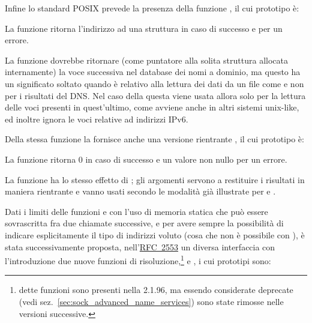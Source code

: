 Infine lo standard POSIX prevede la presenza della funzione
, il cui prototipo è:

\begin{funcproto}{
}

{La funzione ritorna l'indirizzo ad una struttura  in caso di
  successo e  per un errore.}
\end{funcproto}

La funzione dovrebbe ritornare (come puntatore alla solita struttura
 allocata internamente) la voce successiva nel database dei
nomi a dominio, ma questo ha un significato soltato quando è relativo alla
lettura dei dati da un file come  e non per i risultati
del DNS. Nel caso della  questa viene usata allora solo per la
lettura delle voci presenti in quest'ultimo, come avviene anche in altri
sistemi unix-like, ed inoltre ignora le voci relative ad indirizzi IPv6.

Della stessa funzione la  fornisce anche una versione rientrante
, il cui prototipo è:

\begin{funcproto}{
}

{La funzione ritorna $0$ in caso di successo e un valore non nullo per un errore.}
\end{funcproto}

La funzione ha lo stesso effetto di ; gli argomenti servono a
restituire i risultati in maniera rientrante e vanno usati secondo le modalità
già illustrate per  e .

Dati i limiti delle funzioni  e  con
l'uso di memoria statica che può essere sovrascritta fra due chiamate
successive, e per avere sempre la possibilità di indicare esplicitamente il
tipo di indirizzi voluto (cosa che non è possibile con ),
è stata successivamente proposta,
nell'\href{http://www.ietf.org/rfc/rfc2553.txt}{RFC~2553} un diversa
interfaccia con l'introduzione due nuove funzioni di
risoluzione,\footnote{dette funzioni sono presenti nella  2.1.96,
  ma essendo considerate deprecate (vedi
  sez.~\ref{sec:sock_advanced_name_services}) sono state rimosse nelle
  versioni successive.}  e , i
cui prototipi sono:

